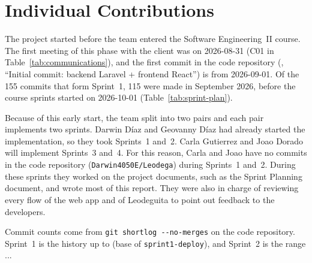 \section{Individual Contributions}
\label{sec:contributions}

The project started before the team entered the Software Engineering~II course.
The first meeting of this phase with the client was on 2026-08-31 (C01 in Table~\ref{tab:communications}), and the first commit in the code repository (, ``Initial commit: backend Laravel + frontend React'') is from 2026-09-01.
Of the 155 commits that form Sprint~1, 115 were made in September 2026, before the course sprints started on 2026-10-01 (Table~\ref{tab:sprint-plan}).

Because of this early start, the team split into two pairs and each pair implements two sprints.
Darwin Díaz and Geovanny Díaz had already started the implementation, so they took Sprints~1 and~2.
Carla Gutierrez and Joao Dorado will implement Sprints~3 and~4.
For this reason, Carla and Joao have no commits in the code repository (\texttt{Darwin4050E/Leodega}) during Sprints~1 and~2.
During these sprints they worked on the project documents, such as the Sprint Planning document, and wrote most of this report.
They were also in charge of reviewing every flow of the web app and of Leodeguita to point out feedback to the developers.

Commit counts come from \texttt{git shortlog -{}-no-merges} on the code repository.
Sprint~1 is the history up to  (base of \texttt{sprint1-deploy}), and Sprint~2 is the range ...

